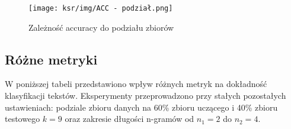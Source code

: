 \documentclass{article}
\begin{document}
\begin{figure}[H]
    \centering
    \texttt{[image: ksr/img/ACC - podział.png]}
    \caption{Zależność accuracy do podziału zbiorów }
    \label{fig:moj-obraz}
\end{figure}

\subsection{Różne metryki}
W poniższej tabeli przedstawiono wpływ różnych metryk na dokładność klasyfikacji tekstów. Eksperymenty przeprowadzono przy stałych pozostałych ustawieniach: podziale zbioru danych na 60\% zbioru uczącego i 40\% zbioru testowego \(k = 9\) oraz zakresie długości n-gramów od \(n_1 = 2\) do \(n_2 = 4\). \\
\end{document}
